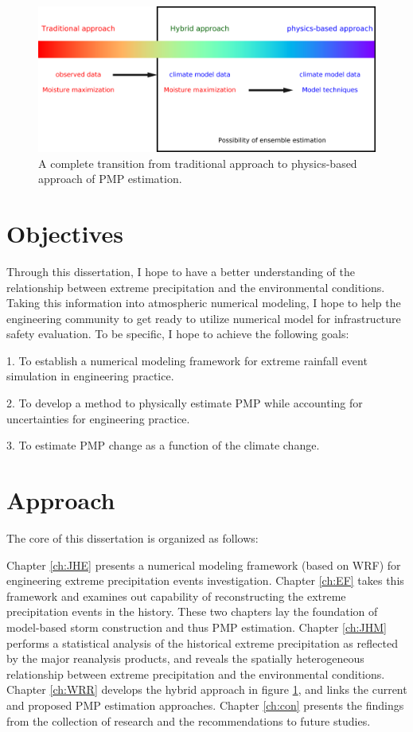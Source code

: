 \begin{figure}[htbp]
	\centering
	\includegraphics[width=\linewidth]{pics/ch1/fig1.png}
	\caption{A complete transition from traditional approach to physics-based approach of PMP estimation.}
    \label{fig:1-1}
\end{figure}

\section {Objectives}

Through this dissertation, I hope to have a better understanding of the relationship between extreme precipitation and the environmental conditions. Taking this information into atmospheric numerical modeling, I hope to help the engineering community to get ready to utilize numerical model for infrastructure safety evaluation. To be specific, I hope to achieve the following goals:

1. To establish a numerical modeling framework for extreme rainfall event simulation in engineering practice.

2. To develop a method to physically estimate PMP while accounting for uncertainties for engineering practice.

3. To estimate PMP change as a function of the climate change.



\section {Approach}

The core of this dissertation is organized as follows:

Chapter \ref{ch:JHE} presents a numerical modeling framework (based on WRF) for engineering extreme precipitation events investigation. Chapter \ref{ch:EF} takes this framework and examines out capability of reconstructing the extreme precipitation events in the history. These two chapters lay the foundation of model-based storm construction and thus PMP estimation. Chapter \ref{ch:JHM} performs a statistical analysis of the historical extreme precipitation as reflected by the major reanalysis products, and reveals the spatially heterogeneous relationship between extreme precipitation and the environmental conditions. Chapter \ref{ch:WRR} develops the hybrid approach in figure \ref{fig:1-1}, and links the current and proposed PMP estimation approaches. Chapter \ref{ch:con} presents the findings from the collection of research and the recommendations to future studies.